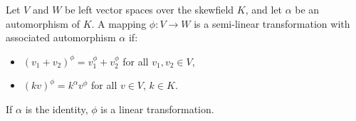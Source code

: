 Let $V$ and $W$ be left vector spaces over the skewfield $K$, and let $\alpha$ be an automorphism of $K$. A mapping $\phi: V \to W$ is a semi-linear transformation with associated automorphism $\alpha$ if:
\begin{itemize}
\item[(i)] $(v_1 + v_2)^\phi = v_1^\phi + v_2^\phi$ for all $v_1, v_2 \in V$,
\item[(ii)] $(kv)^\phi = k^\alpha v^\phi$ for all $v \in V$, $k \in K$.
\end{itemize}
If $\alpha$ is the identity, $\phi$ is a linear transformation.
